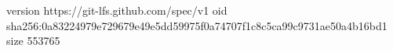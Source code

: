 version https://git-lfs.github.com/spec/v1
oid sha256:0a83224979e729679e49e5dd59975f0a74707f1c8c5ca99c9731ae50a4b16bd1
size 553765
